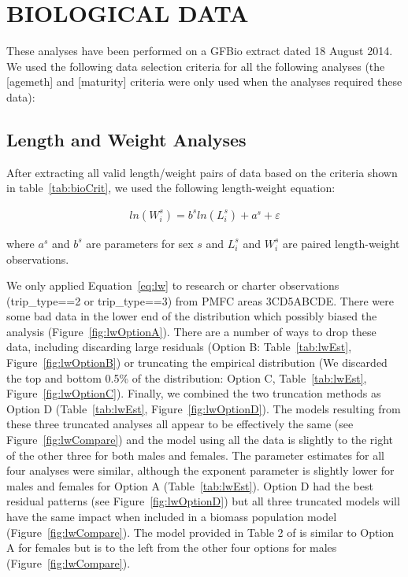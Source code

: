 
\clearpage

\chapter{BIOLOGICAL DATA}

These analyses have been performed on a GFBio extract dated 18 August 2014. We used the following data selection criteria for all the following analyses (the [agemeth] and [maturity] criteria were only used when the analyses required these data):

\section{Length and Weight Analyses}

After extracting all valid length/weight pairs of data based on the criteria shown in table~\ref{tab:bioCrit}, we used the following length-weight equation:

\begin{align} \label{eq:lw}
ln(W_i^s) = b^sln(L_i^s) + a^s + \varepsilon
\end{align}
\begin{addmargin}[3em]{1em}
where $a^s$ and $b^s$ are parameters for sex $s$ and $L_i^s$ and $W_i^s$ are paired length-weight observations.
\end{addmargin}

We only applied Equation~\eqref{eq:lw} to research or charter observations (trip\_type==2 or trip\_type==3) from PMFC areas 3CD5ABCDE. There were some bad data in the lower end of the distribution which possibly biased the analysis (Figure~\ref{fig:lwOptionA}). There are a number of ways to drop these data, including discarding large residuals (Option B: Table~\ref{tab:lwEst}, Figure~\ref{fig:lwOptionB}) or truncating the empirical distribution (We discarded the top and bottom 0.5\% of the distribution: Option C, Table~\ref{tab:lwEst}, Figure~\ref{fig:lwOptionC}). Finally, we combined the two truncation methods as Option D (Table~\ref{tab:lwEst}, Figure~\ref{fig:lwOptionD}). The models resulting from these three truncated analyses all appear to be effectively the same (see Figure~\ref{fig:lwCompare}) and the model using all the data is slightly to the right of the other three for both males and females. The parameter estimates for all four analyses were similar, although the exponent parameter is slightly lower for males and females for Option A (Table~\ref{tab:lwEst}). Option D had the best residual patterns (see Figure~\ref{fig:lwOptionD}) but all three truncated models will have the same impact when included in a biomass population model (Figure~\ref{fig:lwCompare}).  The model provided in Table 2 of \citet{arf2001} is similar to Option A for females but is to the left from the other four options for males (Figure~\ref{fig:lwCompare}).

